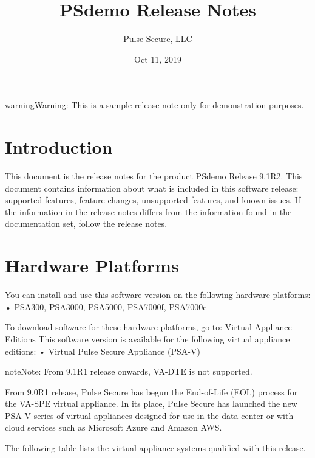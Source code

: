 \documentclass[letterpaper,10pt,english]{sphinxmanual}
\title{PSdemo Release Notes}
\date{Oct 11, 2019}
\author{Pulse Secure, LLC}
\begin{document}
\pagestyle{empty}
\sphinxmaketitle
\pagestyle{plain}
\sphinxtableofcontents
\pagestyle{normal}
\label{\detokenize{relnotes::doc}}


\begin{sphinxadmonition}{warning}{Warning:}
This is a sample release note only for demonstration purposes.
\end{sphinxadmonition}



\chapter{Introduction}
\label{\detokenize{relnotes:introduction}}
This document is the release notes for the product PSdemo Release 9.1R2. This document contains information about what is included in this software release: supported features, feature changes, unsupported features, and known issues. If the information in the release notes differs from the information found in the documentation set, follow the release notes.


\chapter{Hardware Platforms}
\label{\detokenize{relnotes:hardware-platforms}}
You can install and use this software version on the following hardware platforms: • PSA300, PSA3000, PSA5000, PSA7000f, PSA7000c

To download software for these hardware platforms, go to:  Virtual Appliance Editions
This software version is available for the following virtual appliance editions: • Virtual Pulse Secure Appliance (PSA-V)

\begin{sphinxadmonition}{note}{Note:}
From 9.1R1 release onwards, VA-DTE is not supported.

From 9.0R1 release, Pulse Secure has begun the End-of-Life (EOL) process for the VA-SPE virtual appliance. In its place, Pulse Secure has launched the new PSA-V series of virtual appliances designed for use in the data center or with cloud services such as Microsoft Azure and Amazon AWS.
\end{sphinxadmonition}

The following table lists the virtual appliance systems qualified with this release.
\end{document}

